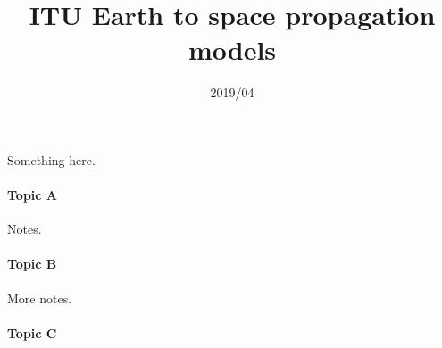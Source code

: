 \documentclass[10pt,notitlepage,oneside]{article}
\begin{document}
\title{ITU Earth to space propagation models}
\date{2019/04 \textendash{} }
\maketitle

Something here.

\paragraph{Topic A}

Notes.

\paragraph{Topic B}

More notes.

\paragraph{Topic C}

\cite{ITU-S-1428-1}

\small



\tableofcontents
\printindex

\todos
\end{document}
